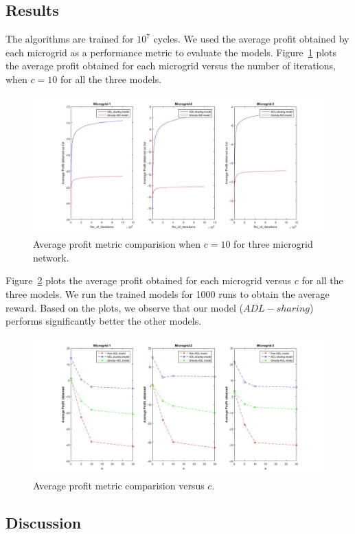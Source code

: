 \subsection{Results}
The algorithms are trained for $10^7$ cycles. We used the average profit obtained by each microgrid as a performance metric to evaluate the models. Figure~\ref{r2} plots the average profit obtained for each microgrid versus the number of iterations, when $c = 10$ for all the three models. 
\begin{figure}[thbp]
	\centering
	\includegraphics[scale = 0.2]{second_plot.jpg}
	\caption{Average profit metric comparision when $c = 10$ for three microgrid network.}
        \label{r2}
\end{figure}

Figure~\ref{r1} plots the average profit obtained for each microgrid versus $c$ for all the three models. We run the trained models for 1000 runs to obtain the average reward. Based on the plots, we observe that our model ($ADL-sharing$) performs significantly better the other models.  
\begin{figure}[thbp]
	\centering
	\includegraphics[scale = 0.2]{first_plot.jpg}
	\caption{Average profit metric comparision versus $c$.}
	 \label{r1}
\end{figure}
\subsection{Discussion}

